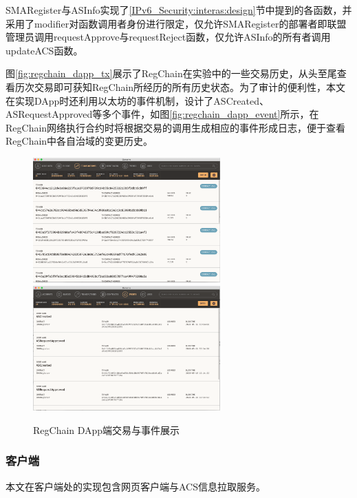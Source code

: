      SMARegister与ASInfo实现了\ref{IPv6_Security:interas:design}节中提到的各函数，并采用了modifier对函数调用者身份进行限定，仅允许SMARegister的部署者即联盟管理员调用requestApprove与requestReject函数，仅允许ASInfo的所有者调用updateACS函数。
    
      图\ref{fig:regchain_dapp_tx}展示了RegChain在实验中的一些交易历史，从头至尾查看历次交易即可获知RegChain所经历的所有历史状态。为了审计的便利性，本文在实现DApp时还利用以太坊的事件机制，设计了ASCreated、ASRequestApproved等多个事件，如图\ref{fig:regchain_dapp_event}所示，在RegChain网络执行合约时将根据交易的调用生成相应的事件形成日志，便于查看RegChain中各自治域的变更历史。

      \begin{figure}[H]
        \centering
        {\includegraphics[height=4.8cm]{figures/regchain_dapp_tx.png}}
        \hspace{1em}
        {\includegraphics[height=4.8cm]{figures/regchain_dapp_event.png}}
        \caption{RegChain DApp端交易与事件展示}
        \label{fig:regchain_dapp_images}
      \end{figure}


      \subsubsection{客户端}
      \label{IPv6_Security:interas:implement:client}
      本文在客户端处的实现包含网页客户端与ACS信息拉取服务。
      
